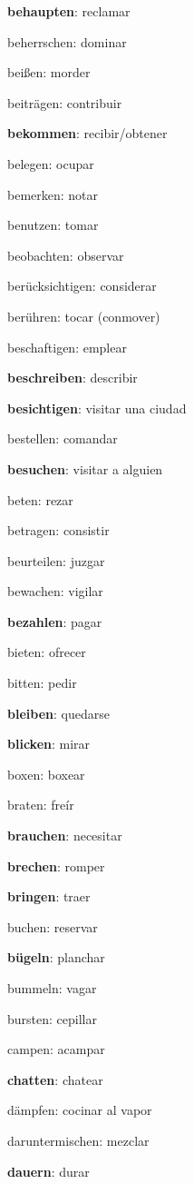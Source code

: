 \begin{multicols}{2}
\begin{myitemize}
\item \textbf{behaupten}: reclamar
\item beherrschen: dominar
\item beißen: morder
\item beiträgen: contribuir
\item \textbf{bekommen}: recibir/obtener
\item belegen: ocupar
\item bemerken: notar
\item benutzen: tomar
\item beobachten: observar
\item berücksichtigen: considerar
\item berühren: tocar (conmover)
\item beschaftigen: emplear
\item \textbf{beschreiben}: describir
\item \textbf{besichtigen}: visitar una ciudad
\item bestellen: comandar
\item \textbf{besuchen}: visitar a alguien
\item beten: rezar
\item betragen: consistir
\item beurteilen: juzgar
\item bewachen: vigilar
\item \textbf{bezahlen}: pagar
\item bieten: ofrecer
\item bitten: pedir
\item \textbf{bleiben}: quedarse
\item \textbf{blicken}: mirar
\item boxen: boxear
\item braten: freír
\item \textbf{brauchen}: necesitar
\item \textbf{brechen}: romper
\item \textbf{bringen}: traer
\item buchen: reservar
\item \textbf{bügeln}: planchar
\item bummeln: vagar
\item bursten: cepillar
\item campen: acampar
\item \textbf{chatten}: chatear
\item dämpfen: cocinar al vapor
\item daruntermischen: mezclar
\item \textbf{dauern}: durar

\end{myitemize}
\end{multicols}
